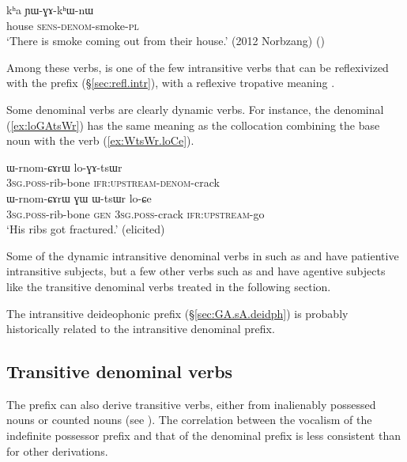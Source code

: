 \begin{exe}
\ex \label{ex:kha.YWGAkhWnW}
 \gll  kʰa ɲɯ-ɣɤ-kʰɯ-nɯ \\
 house \textsc{sens}-\textsc{denom}-smoke-\textsc{pl} \\
\glt `There is smoke coming out from their house.' (2012 Norbzang) ()
\end{exe} 

Among these verbs,  is one of the few intransitive verbs that can be reflexivized with the  prefix (§\ref{sec:refl.intr}), with a reflexive tropative meaning . 

Some  denominal verbs are clearly dynamic verbs. For instance, the denominal  (\ref{ex:loGAtsWr})  has the same meaning as the collocation combining the base noun  with the verb   (\ref{ex:WtsWr.loCe}).

\begin{exe}
\ex 
\begin{xlist}
\ex \label{ex:loGAtsWr}
 \gll ɯ-rnom-ɕɤrɯ lo-ɣɤ-tsɯr \\
\textsc{3sg}.\textsc{poss}-rib-bone  \textsc{ifr}:\textsc{upstream}-\textsc{denom}-crack \\
\ex \label{ex:WtsWr.loCe}
 \gll ɯ-rnom-ɕɤrɯ ɣɯ ɯ-tsɯr lo-ɕe \\
\textsc{3sg}.\textsc{poss}-rib-bone \textsc{gen} \textsc{3sg}.\textsc{poss}-crack  \textsc{ifr}:\textsc{upstream}-go \\
 \glt `His ribs got fractured.' (elicited)
 \end{xlist}
\end{exe} 

Some of the dynamic intransitive denominal verbs in  such as  and  have patientive intransitive subjects, but a few other verbs such as  and  have agentive subjects like the transitive denominal  verbs treated in the following section.

The intransitive deideophonic  prefix (§\ref{sec:GA.sA.deidph}) is probably historically related to the  intransitive denominal prefix.

\subsection{Transitive  denominal verbs}   \label{sec:denom.tr.GA}
The  prefix can also derive transitive verbs,  either from inalienably possessed nouns or counted nouns (see ). The correlation between the  vocalism of the indefinite possessor prefix  and that of the denominal prefix   is less consistent than for other derivations. 
 
